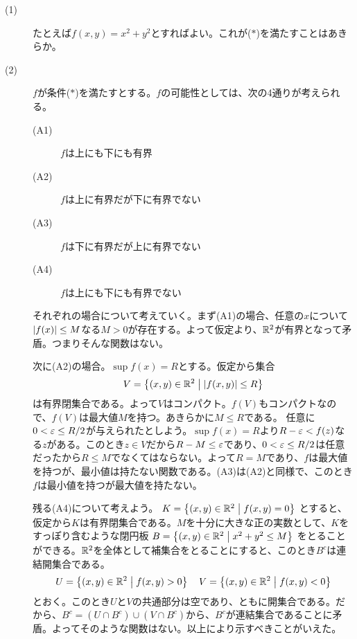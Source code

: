 \begin{sol} ${}$
  \begin{description}
    \item[(1)] たとえば$f(x,y) = x^2 + y^2$とすればよい。これが($*$)を満たすことはあきらか。
    \item[(2)] $f$が条件($*$)を満たすとする。$f$の可能性としては、次の4通りが考えられる。
\begin{description}
  \item[(A1)] $f$は上にも下にも有界
  \item[(A2)] $f$は上に有界だが下に有界でない
  \item[(A3)] $f$は下に有界だが上に有界でない
  \item[(A4)] $f$は上にも下にも有界でない
\end{description}
    それぞれの場合について考えていく。まず(A1)の場合、任意の$x$について$\left \lvert f(x) \right \rvert \leq M$なる$M > 0$が存在する。よって仮定より、${\mathbb R}^2$が有界となって矛盾。つまりそんな関数はない。

    次に(A2)の場合。$\sup f(x) = R$とする。仮定から集合
    \[
    V = \left\{ (x,y) \in {\mathbb R}^2 \mathrel{} \middle| \mathrel{}  \left \lvert f(x,y) \right \rvert \leq R  \right\}
    \]
    は有界閉集合である。よって$V$はコンパクト。$f(V)$もコンパクトなので、$f(V)$は最大値$M$を持つ。あきらかに$M \leq R$である。
    任意に$0 < {\varepsilon} \leq R/2$が与えられたとしよう。$\sup f(x) = R$より$R-{\varepsilon} < f(z)$なる$z$がある。このとき$z \in V$だから$R - M \leq {\varepsilon}$であり、$0 < {\varepsilon} \leq R/2$は任意だったから$R \leq M$でなくてはならない。よって$R=M$であり、$f$は最大値を持つが、最小値は持たない関数である。(A3)は(A2)と同様で、このとき$f$は最小値を持つが最大値を持たない。

    残る(A4)について考えよう。
    $
    K = \left\{ (x,y) \in {\mathbb R}^2 \mathrel{} \middle| \mathrel{} f(x,y)=0  \right\}
    $
    とすると、仮定から$K$は有界閉集合である。$M$を十分に大きな正の実数として、$K$をすっぽり含むような閉円板
    $
    B= \left\{ (x,y) \in {\mathbb R}^2 \mathrel{} \middle| \mathrel{}  x^2 + y^2 \leq M \right\}
    $
    をとることができる。${\mathbb R}^2$を全体として補集合をとることにすると、このとき$B^c$は連結開集合である。
    \[
    U = \left\{ (x,y) \in {\mathbb R}^2 \mathrel{} \middle| \mathrel{} f(x,y) > 0 \right\} \quad V = \left\{ (x,y) \in {\mathbb R}^2 \mathrel{} \middle| \mathrel{} f(x,y) < 0 \right\}
    \]
    とおく。このとき$U$と$V$の共通部分は空であり、ともに開集合である。だから、$B^c = (U \cap B^c) \cup (V \cap B^c)$から、$B^c$が連結集合であることに矛盾。よってそのような関数はない。以上により示すべきことがいえた。
  \end{description}
\end{sol}


\newpage




